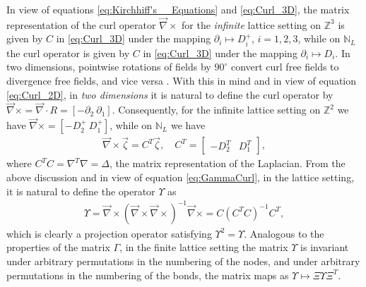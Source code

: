 \documentclass{cmslatex}
\begin{document}
In view of equations \eqref{eq:Kirchhiff's__Equations} and
\eqref{eq:Curl_3D}, the matrix representation of the curl operator
$\vec{\nabla}\times$ for the \emph{infinite} lattice setting on $\mathbb{Z}^3$
is given by $C$ in \eqref{eq:Curl_3D} under the mapping $\partial_i\mapsto D^+_i$,
$i=1,2,3$, while on $\mathbb{N}_L$ the curl operator is given by
$C$ in \eqref{eq:Curl_3D} under the mapping $\partial_i\mapsto D_i$. In two
dimensions, pointwise rotations of fields by $90^\circ$ convert curl free
fields to divergence free fields, and vice versa
\cite{MILTON:2002:TC}. With this in mind and in view of equation
\eqref{eq:Curl_2D}, in \emph{two dimensions} it is natural to define
the curl operator by $\vec{\nabla}\times=\vec{\nabla}\cdot R=[ - \partial_2 \
\partial_1]$. Consequently, for the infinite lattice setting on
$\mathbb{Z}^2$ we have $\vec{\nabla}\times=[ - D^+_2 \ D^+_1]$, while on
$\mathbb{N}_L$ we have  
%
\begin{align}
  \vec{\nabla}\times\vec{\zeta}=C^T\vec{\zeta}, \quad
  C^T=
  \left[
    \begin{array}{ccc}
       -D_2^T  &   D_1^T
    \end{array}
  \right],
\end{align}
%
where $C^TC=\nabla^T\nabla=\Delta$, the matrix representation of the Laplacian. From
the above discussion and in view of equation \eqref{eq:GammaCurl}, in
the lattice setting, it is natural to define the operator $\Upsilon$ as
%
\begin{align}\label{eq:GammaCurl_NL}
  \Upsilon=\vec{\nabla}\times(\vec{\nabla}\times\vec{\nabla}\times)^{-1}\vec{\nabla}\times
   =C(C^TC)^{-1}C^T,
\end{align}
%
which is clearly a projection operator satisfying $\Upsilon^2=\Upsilon$. Analogous
to the properties of the matrix $\Gamma$, in the finite lattice setting the 
matrix $\Upsilon$ is invariant under arbitrary permutations in the numbering
of the nodes, and under arbitrary permutations in
the numbering of the bonds, the matrix maps as $\Upsilon\mapsto \Xi\Upsilon \Xi^T$.  
\end{document}
